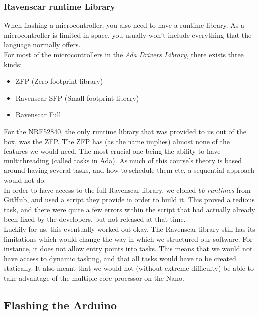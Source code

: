 \documentclass{article}
\begin{document}
\subsubsection{Ravenscar runtime Library}

When flashing a microcontroller, you also need to have a runtime library. As a microcontroller is limited in space, you usually won't include everything that the language normally offers.\\

For most of the microcontrollers in the \textit{Ada Drivers Library}, there exists three kinds:
\begin{itemize}
  \item{ZFP (Zero footprint library)}
  \item{Ravenscar SFP (Small footprint library)}
  \item{Ravenscar Full}
\end{itemize}

For the NRF52840, the only runtime library that was provided to us out of the box, was the ZFP. The ZFP has (as the name implies) almost none of the features we would need. The most crucial one being the ability to have multithreading (called tasks in Ada). As much of this course's theory is based around having several tasks, and how to schedule them etc, a sequential approach would not do.\\

In order to have access to the full Ravenscar library, we cloned \textit{bb-runtimes} from GitHub, and used a script they provide in order to build it. This proved a tedious task, and there were quite a few errors within the script that had actually already been fixed by the developers, but not released at that time.\\

Luckily for us, this eventually worked out okay. The Ravenscar library still has its limitations which would change the way in which we structured our software. For instance, it does not allow entry points into tasks. This means that we would not have access to dynamic tasking, and that all tasks would have to be created statically. It also meant that we would not (without extreme difficulty) be able to take advantage of the multiple core processor on the Nano.\\

\subsection{Flashing the Arduino}
\end{document}
